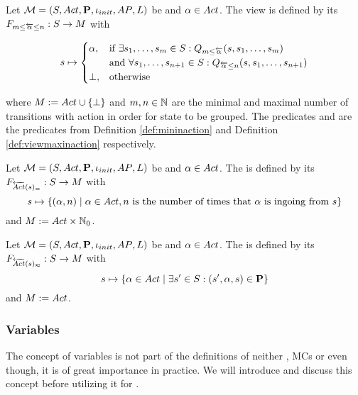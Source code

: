 \documentclass[preview]{standalone}
\begin{document}
\begin{definition}
	Let $\chgph = \chgphtuple$ be \achgphN and $\action \in \actions$. The view 
	\viewspaninaction is defined by its \grpfctN $\gfctspaninaction : \states \to \arbset$ with
	
	\[
	\state \mapsto
	\begin{cases}
		\action,				& \text{if } \exists \state_1, \dots, \state_\numinactb \in \states: \predmininact[\numinactb] \\ &\text{and } \forall \state_1, \dots, \state_{\numinact+1} \in \states: \predmaxinact \\
		\remelem,          	& \text{otherwise}
	\end{cases}
	\]
	
	where $\imggrp := \actions \cup \remset$ and $\numinactb, \numinact \in \natnums$ are the minimal and maximal number of transitions with action \action in order for state to be grouped. The predicates \predmininact and \predmaxinact are the predicates from Definition \ref{def:mininaction} and Definition \ref{def:viewmaxinaction} respectively.
\end{definition}

\begin{definition}
	Let $\chgph = \chgphtuple$ be \achgphN and $\action \in \actions$. The \viewN \viewstronginactident is defined by its \grpfctN $\gfctstronginactident : \states \to \imggrp$ with
	\[
	\state \mapsto	
	\{(\action, \numinact) \mid \action \in \actions, \numinact \text{ is the number of times that \action is ingoing from } \state\}
	\]
	and $\imggrp := \actions \times \natnums_0$.
\end{definition}

\begin{definition}
	Let $\chgph = \chgphtuple$ be \achgphN and $\action \in \actions$. The \viewN \viewweakinactident is defined by its \grpfctN $\gfctweakinactident : \states \to \imggrp$ with
	\[
	\state \mapsto \{\action \in \actions \mid \exists \state' \in \states : (\state', \action, \state) \in \trans\} 	
	\]
	and $\imggrp := \actions$.
\end{definition}

\subsubsection{Variables}
The concept of variables is not part of the definitions of neither \tsN, MCs or \mdpsN even though, it is of great importance in practice. We will introduce and discuss this concept before utilizing it for \viewsN.
\end{document}
